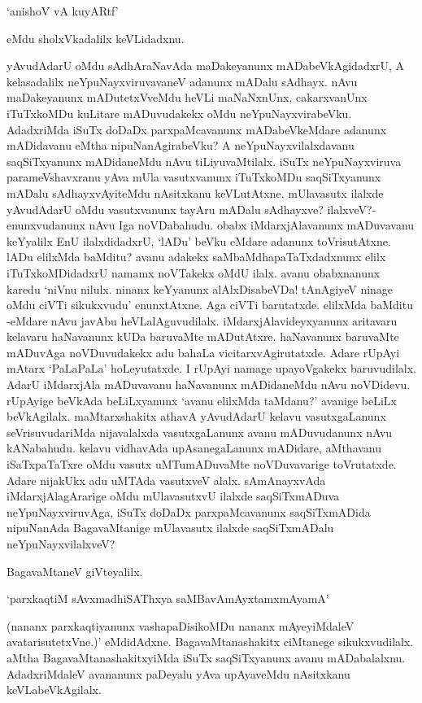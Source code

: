 \begin{shloka}
`anishoV vA kuyARtf'
\end{shloka}

eMdu sholxVkadalilx keVLidadxnu.

yAvudAdarU oMdu sAdhAraNavAda maDakeyanunx mADabeVkAgidadxrU, A kelasadalilx neYpuNayxviruvavaneV adanunx mADalu sAdhayx. nAvu maDakeyanunx mADutetxVveMdu heVLi maNaNxnUnx, cakarxvanUnx iTuTxkoMDu kuLitare mADuvudakekx oMdu neYpuNayxvirabeVku. AdadxriMda iSuTx doDaDx parxpaMcavanunx mADabeVkeMdare adanunx mADidavanu eMtha nipuNanAgirabeVku? A neYpuNayxvilalxdavanu saqSiTxyanunx mADidaneMdu nAvu tiLiyuvaMtilalx. iSuTx neYpuNayxviruva parameVshavxranu yAva mUla vasutxvanunx iTuTxkoMDu saqSiTxyanunx mADalu sAdhayxvAyiteMdu nAsitxkanu keVLutAtxne. mUlavasutx ilalxde yAvudAdarU oMdu vasutxvanunx tayAru mADalu sAdhayxve? ilalxveV?- enunxvudanunx nAvu Iga noVDabahudu. obabx iMdarxjAlavanunx mADuvavanu keYyalilx EnU ilalxdidadxrU, `lADu' beVku eMdare adanunx toVrisutAtxne. lADu elilxMda baMditu? avanu adakekx saMbaMdhapaTaTxdadxnunx elilx iTuTxkoMDidadxrU namamx noVTakekx oMdU ilalx. avanu obabxnanunx karedu `niVnu nilulx. ninanx keYyanunx alAlxDisabeVDa! tAnAgiyeV ninage oMdu ciVTi sikukxvudu' enunxtAtxne. Aga ciVTi barutatxde. elilxMda baMditu -eMdare nAvu javAbu heVLalAguvudilalx. iMdarxjAlavideyxyanunx aritavaru kelavaru haNavanunx kUDa baruvaMte mADutAtxre. haNavanunx baruvaMte mADuvAga noVDuvudakekx adu bahaLa vicitarxvAgirutatxde. Adare rUpAyi mAtarx `PaLaPaLa' hoLeyutatxde. I rUpAyi namage upayoVgakekx baruvudilalx. AdarU iMdarxjAla mADuvavanu haNavanunx mADidaneMdu nAvu noVDidevu. rUpAyige beVkAda beLiLxyanunx `avanu elilxMda taMdanu?' avanige beLiLx beVkAgilalx. maMtarxshakitx athavA yAvudAdarU kelavu vasutxgaLanunx seVrisuvudariMda nijavalalxda vasutxgaLanunx avanu mADuvudanunx nAvu kANabahudu. kelavu vidhavAda upAsanegaLanunx mADidare, aMthavanu iSaTxpaTaTxre oMdu vasutx uMTumADuvaMte noVDuvavarige toVrutatxde. Adare nijakUkx adu uMTAda vasutxveV alalx. sAmAnayxvAda iMdarxjAlagArarige oMdu mUlavasutxvU ilalxde saqSiTxmADuva neYpuNayxviruvAga, iSuTx doDaDx parxpaMcavanunx saqSiTxmADida nipuNanAda BagavaMtanige mUlavasutx ilalxde saqSiTxmADalu neYpuNayxvilalxveV?

BagavaMtaneV giVteyalilx.

\begin{shloka}
`parxkaqtiM sAvxmadhiSAThxya saMBavAmAyxtamxmAyamA'
\end{shloka}

(nananx parxkaqtiyanunx vashapaDisikoMDu nananx mAyeyiMdaleV avatarisutetxVne.)' eMdidAdxne. BagavaMtanashakitx ciMtanege sikukxvudilalx. aMtha BagavaMtanashakitxyiMda iSuTx saqSiTxyanunx avanu mADabalalxnu. AdadxriMdaleV avananunx paDeyalu yAva upAyaveMdu nAsitxkanu keVLabeVkAgilalx.

